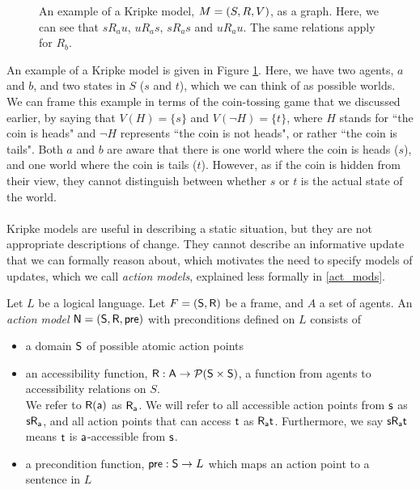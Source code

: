 \begin{figure}
\centering
{}
\caption[Kripke model example of coin-game]{An example of a Kripke model, $M = (S,R,V)$, as a graph. Here, we can see that
$s R_a u$, $u R_a s$, $s R_a s$ and $u R_a u$. The same relations apply for
$R_b$.}
\label{figure:exampleModel}
\end{figure}

An example of a Kripke model is given in Figure \ref{figure:exampleModel}.
Here, we have two agents, $a$ and $b$, and two states in $S$ ($s$ and $t$), which we can think
of as possible worlds.
We can frame this example in terms of the coin-tossing game that we discussed earlier, by saying
that $V(H) = \{s\}$ and $V(\neg H) = \{t\}$, where $H$ stands for ``the coin is heads"
and $\neg H$ represents ``the coin is not heads", or rather ``the coin is tails".
Both $a$ and $b$ are aware that there is one world where the coin is heads ($s$), and one
world where the coin is tails ($t$).
However, as if the coin is hidden from their view, they cannot distinguish between whether $s$ or
$t$ is the actual state of the world.\\
\\
Kripke models are useful in describing a static situation, but they are not appropriate descriptions
of change.
They cannot describe an informative update that we can formally reason about, which motivates the
need to specify models of updates, which we call {\em action models}, explained less formally in
\ref{act_mods}.

\begin{defn} \label{evModel}
	Let $L$ be a logical language.
	Let $F = (\mathrm{\mathsf{S}}, \mathrm{\mathsf{R}})$ be a frame, and $A$ a set of agents.
	An {\em action model} $\mathrm{\mathsf{\mathrm{\mathsf{N}} = (S, R, pre)}}$ with preconditions defined
  on $L$ consists of
	\begin{itemize}
		\item a domain $\mathrm{\mathsf{S}}$ of possible atomic action points
		\item an accessibility function, $\mathrm{\mathsf{R: A \to \mathcal{P}(S \times
        S)}}$, a function from agents to
		accessibility relations on $S$.\\
		We refer to $\mathrm{\mathsf{R(a)}}$ as $\mathrm{\mathsf{R_a}}$.
		We will refer to all accessible action points from $\mathrm{\mathsf{s}}$ as
    $\mathrm{\mathsf{s R_a}}$, and all action points that
		can access $\mathrm{\mathsf{t}}$ as $\mathrm{\mathsf{R_a t}}$.
		Furthermore, we say $\mathrm{\mathsf{s R_a t}}$ means $\mathrm{\mathsf{t}}$ is
    $\mathrm{\mathsf{a}}$-accessible from $\mathrm{\mathsf{s}}$.
		\item a precondition function, $\mathrm{\mathsf{pre: S}} \to L$ which maps an action point to a
		sentence in $L$
	\end{itemize}
\end{defn}

